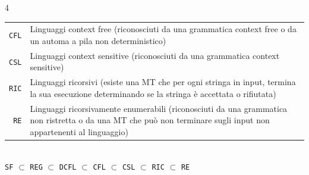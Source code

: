 \documentclass[10pt,landscape]{article}
\begin{document}
\begin{multicols*}{4}
\begin{tabular}{@{}r p{7.6cm}@{}}
                \verb|CFL|  & Linguaggi context free (riconosciuti da una grammatica context free o da un automa a pila non deterministico)                                        \\
                \verb|CSL|  & Linguaggi context sensitive (riconosciuti da una grammatica context sensitive)                              \\
                \verb|RIC|  & Linguaggi ricorsivi (esiste una MT che per ogni stringa in input, termina la sua esecuzione determinando se la stringa è accettata o rifiutata)      \\
                \verb|RE|   & Linguaggi ricorsivamente enumerabili (riconosciuti da una grammatica non ristretta o da una MT
    che può non terminare sugli input non appartenenti al linguaggio)                         \\
        \end{tabular} \\ [5pt]
        \verb|SF| $\subset$ \verb|REG| $\subset$ \verb|DCFL| $\subset$ \verb|CFL| $\subset$ \verb|CSL| $\subset$ \verb|RIC| $\subset$ \verb|RE|\\ [3pt]
        \vspace{-0.3cm}

\end{multicols*}
\end{document}
